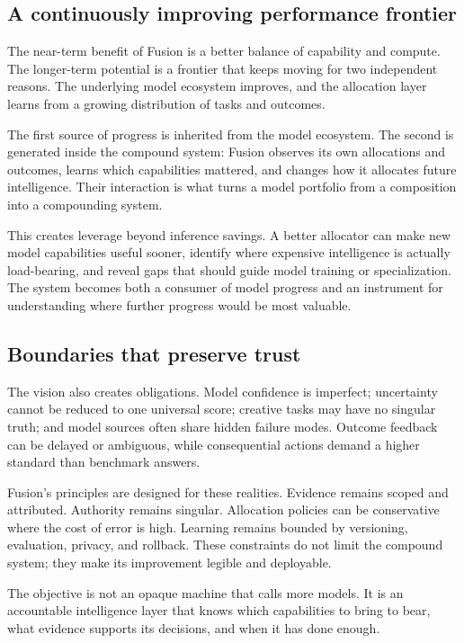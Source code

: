 \subsection{A continuously improving performance frontier}

The near-term benefit of Fusion is a better balance of capability and compute.
The longer-term potential is a frontier that keeps moving for two independent
reasons. The underlying model ecosystem improves, and the allocation layer
learns from a growing distribution of tasks and outcomes.

The first source of progress is inherited from the model ecosystem. The second
is generated inside the compound system: Fusion observes its own allocations
and outcomes, learns which capabilities mattered, and changes how it allocates
future intelligence. Their interaction is what turns a model portfolio from a
composition into a compounding system.

This creates leverage beyond inference savings. A better allocator can make
new model capabilities useful sooner, identify where expensive intelligence is
actually load-bearing, and reveal gaps that should guide model training or
specialization. The system becomes both a consumer of model progress and an
instrument for understanding where further progress would be most valuable.

\subsection{Boundaries that preserve trust}

The vision also creates obligations. Model confidence is imperfect;
uncertainty cannot be reduced to one universal score; creative tasks may have
no singular truth; and model sources often share hidden failure modes. Outcome
feedback can be delayed or ambiguous, while consequential actions demand a
higher standard than benchmark answers.

Fusion's principles are designed for these realities. Evidence remains scoped
and attributed. Authority remains singular. Allocation policies can be
conservative where the cost of error is high. Learning remains bounded by
versioning, evaluation, privacy, and rollback. These constraints do not limit
the compound system; they make its improvement legible and deployable.

The objective is not an opaque machine that calls more models. It is an
accountable intelligence layer that knows which capabilities to bring to bear,
what evidence supports its decisions, and when it has done enough.
